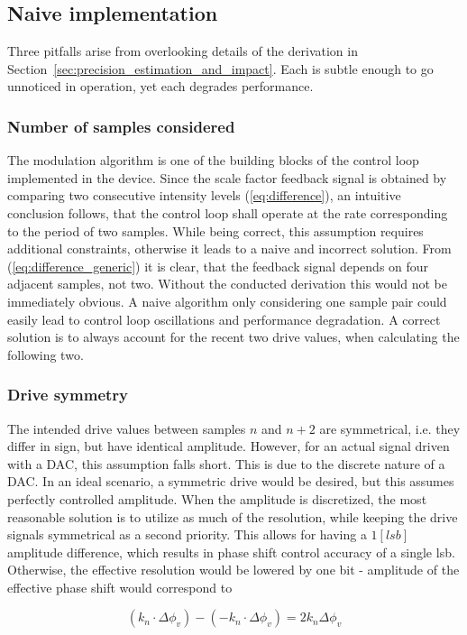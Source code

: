 \documentclass[journal,twoside,web]{ieeecolor}
\begin{document}
\subsection{Naive implementation}
Three pitfalls arise from overlooking details of the derivation in Section~\ref{sec:precision_estimation_and_impact}. Each is subtle enough to go unnoticed in operation, yet each degrades performance.

\subsubsection{Number of samples considered}
The modulation algorithm is one of the building blocks of the control loop implemented in the device. Since the scale factor feedback signal is obtained by comparing two consecutive intensity levels (\ref{eq:difference}), an intuitive conclusion follows, that the control loop shall operate at the rate corresponding to the period of two samples. While being correct, this assumption requires additional constraints, otherwise it leads to a naive and incorrect solution. From (\ref{eq:difference_generic}) it is clear, that the feedback signal depends on four adjacent samples, not two. Without the conducted derivation this would not be immediately obvious. A naive algorithm only considering one sample pair could easily lead to control loop oscillations and performance degradation. A correct solution is to always account for the recent two drive values, when calculating the following two. 

\subsubsection{Drive symmetry}
The intended drive values between samples $n$ and $n+2$ are symmetrical, i.e. they differ in sign, but have identical amplitude. However, for an actual signal driven with a DAC, this assumption falls short. This is due to the discrete nature of a DAC. In an ideal scenario, a symmetric drive would be desired, but this assumes perfectly controlled amplitude. When the amplitude is discretized, the most reasonable solution is to utilize as much of the resolution, while keeping the drive signals symmetrical as a second priority. This allows for having a $1 [lsb]$ amplitude difference, which results in phase shift control accuracy of a single lsb. Otherwise, the effective resolution would be lowered by one bit - amplitude of the effective phase shift would correspond to 

\begin{equation}
    (k_{n} \cdot \Delta\phi_{v}) - (-k_{n} \cdot \Delta\phi_{v}) = 2k_{n}\Delta\phi_{v}
\end{equation}
\end{document}
